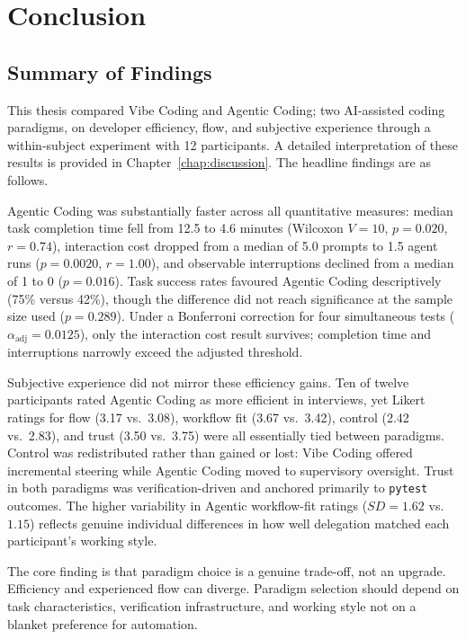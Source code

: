 
\chapter{Conclusion}

\label{chap:conclusion}

\section{Summary of Findings}

This thesis compared Vibe Coding and Agentic Coding; two AI-assisted coding paradigms, on developer efficiency, flow, and subjective experience through a within-subject experiment with 12 participants. A detailed interpretation of these results is provided in Chapter~\ref{chap:discussion}. The headline findings are as follows.

Agentic Coding was substantially faster across all quantitative measures: median task completion time fell from 12.5 to 4.6 minutes (Wilcoxon $V=10$, $p=0.020$, $r=0.74$), interaction cost dropped from a median of 5.0 prompts to 1.5 agent runs ($p=0.0020$, $r=1.00$), and observable interruptions declined from a median of 1 to 0 ($p=0.016$). Task success rates favoured Agentic Coding descriptively (75\% versus 42\%), though the difference did not reach significance at the sample size used ($p=0.289$). Under a Bonferroni correction for four simultaneous tests ($\alpha_{\text{adj}}=0.0125$), only the interaction cost result survives; completion time and interruptions narrowly exceed the adjusted threshold.

Subjective experience did not mirror these efficiency gains. Ten of twelve participants rated Agentic Coding as more efficient in interviews, yet Likert ratings for flow (3.17 vs.\ 3.08), workflow fit (3.67 vs.\ 3.42), control (2.42 vs.\ 2.83), and trust (3.50 vs.\ 3.75) were all essentially tied between paradigms. Control was redistributed rather than gained or lost: Vibe Coding offered incremental steering while Agentic Coding moved to supervisory oversight. Trust in both paradigms was verification-driven and anchored primarily to \texttt{pytest} outcomes. The higher variability in Agentic workflow-fit ratings ($SD=1.62$ vs.\ $1.15$) reflects genuine individual differences in how well delegation matched each participant's working style.

The core finding is that paradigm choice is a genuine trade-off, not an upgrade. Efficiency and experienced flow can diverge. Paradigm selection should depend on task characteristics, verification infrastructure, and working style not on a blanket preference for automation.

